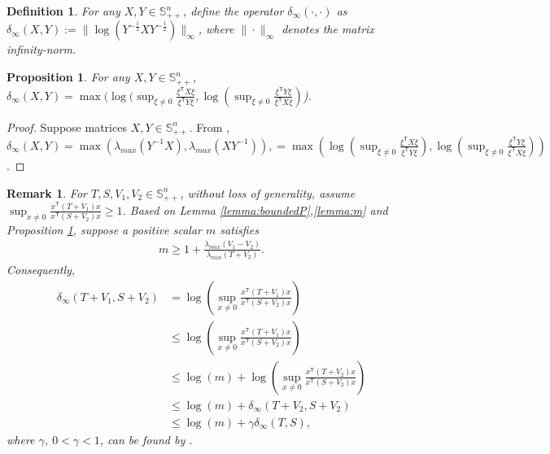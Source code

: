 \documentclass[letterpaper, 10 pt, conference]{ieeeconf}  %
\newcommand{\transpose}{\mathsf{T}}
\newcommand{\quadinner}[1]{x^{\transpose}(#1)x}
\newtheorem{definition}{Definition}
\newtheorem{proposition}{Proposition}
\newtheorem{remark}{Remark}
\begin{document}
\begin{definition}
    For any $X,Y\in \mathbb{S}_{++}^{n}$, define the operator $\delta_{\infty}(\cdot, \cdot)$ as
  $ \delta_{\infty}(X, Y) := \| \log(Y^{-\frac{1}{2}}XY^{-\frac{1}{2}})\|_{\infty}$, where $\|\cdot\|_{\infty}$ denotes the matrix infinity-norm.
\end{definition}

\begin{proposition}\label{proposition:deltaRatio}
    For any $X,Y\in \mathbb{S}_{++}^{n}$,
$ \delta_{\infty}(X,Y) = \max(\log(\sup_{\xi\neq0} \frac{\xi^{\transpose}X\xi}{\xi^{\transpose}Y\xi},\log(\sup_{\xi\neq0} \frac{\xi^{\transpose}Y\xi}{\xi^{\transpose}X\xi})$).
\end{proposition}
\begin{proof}
    Suppose matrices $X,Y\in\mathbb{S}_{++}^{n}$. From \cite[Remark 2.2.]{lee_invariant_2008}, $\delta_{\infty}(X,Y) = \max(\lambda_{max}(Y^{-1}X),\lambda_{max}(XY^{-1})), = \max(\log(\sup_{\xi\neq0} \frac{\xi^{\transpose}X\xi}{\xi^{\transpose}Y\xi}),\log(\sup_{\xi\neq0} \frac{\xi^{\transpose}Y\xi}{\xi^{\transpose}X\xi}))$.
\end{proof}

\begin{remark}\label{remark:delta}
    For $T,S,V_{1},V_{2}\in \mathbb{S}_{++}^{n}$, without loss of generality, assume
    $\sup_{x\neq 0} \frac{\quadinner{T+V_{1}}}{\quadinner{S+V_{2}}} \geq 1$.
    Based on Lemma \ref{lemma:boundedP},\ref{lemma:m} and Proposition \ref{proposition:deltaRatio}, suppose a positive scalar $m$ satisfies
    \begin{align*}
        m \geq 1+\frac{\lambda_{max}(V_{1}-V_{2})}{\lambda_{min}(T+V_{2})}.
    \end{align*}
   Consequently, 
    \begin{align*}
        \delta_{\infty}(T+V_{1},S+V_{2}) &= \log( \sup_{x\neq 0} \frac{\quadinner{T+V_{1}}}{\quadinner{S+V_{2}}})\\
        &\leq \log(\sup_{x\neq 0} \frac{\quadinner{T+V_{1}}}{\quadinner{S+V_{2}}})\\
        &\leq \log(m)+\log(\sup_{x\neq 0} \frac{\quadinner{T+V_{2}}}{\quadinner{S+V_{2}}})\\
        &\leq \log(m) + \delta_{\infty}(T+V_{2},S+V_{2})\\
        &\leq \log(m) + \gamma\delta_{\infty}(T,S),
    \end{align*}
    where $\gamma$, $0<\gamma<1$, can be found by \cite[Lemma D.2]{krauth_finite-time_2019}.
\end{remark}
\end{document}
